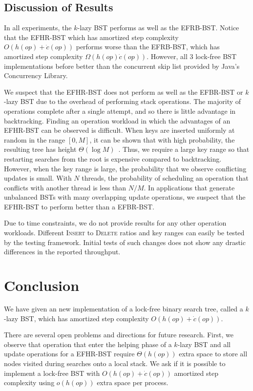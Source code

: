 \documentclass[letterpaper,twocolumn]{article}
\begin{document}
\subsection{Discussion of Results}
In all experiments, the $k$-lazy BST performs as well as the EFRB-BST. Notice that the EFHR-BST which has amortized step complexity $O(h(op) + \dot{c}(op))$ performs worse than the EFRB-BST, which has amortized step complexity $\Omega(h(op)\dot{c}(op))$. However, all 3 lock-free BST implementations before better than the concurrent skip list provided by Java's Concurrency Library. 

We suspect that the EFHR-BST does not perform as well as the EFBR-BST or $k$-lazy BST due to the overhead of performing stack operations. The majority of operations complete after a single attempt, and so there is little advantage in backtracking. Finding an operation workload in which the advantages of an EFHR-BST can be observed is difficult. When keys are inserted uniformly at random in the range $[0,M]$, it can be shown that with high probability, the resulting tree has height $\Theta(\log M)$~\cite{CLRS}. Thus, we require a large key range so that restarting searches from the root is expensive compared to backtracking. However, when the key range is large, the probability that we observe conflicting updates is small. With $N$ threads, the probability of scheduling an operation  that conflicts with another thread is less than $N/M$. In applications that generate unbalanced BSTs with many overlapping update operations, we suspect that the EFHR-BST to perform better than a EFBR-BST. 

Due to time constraints, we do not provide results for any other operation workloads. Different \textsc{Insert} to \textsc{Delete} ratios and key ranges can easily be tested by the testing framework. Initial tests of such changes does not show any drastic differences in the reported throughput.

\section{Conclusion}\label{section_conclusion}
We have given an new implementation of a lock-free binary search tree, called a $k$-lazy BST, which has amortized step complexity $O(h(op) + \dot{c}(op))$. 

There are several open problems and directions for future research. First, we observe that operation that enter the helping phase of a $k$-lazy BST and all update operations for a EFHR-BST require $\Theta(h(op))$ extra space to store all nodes visited during searches onto a local stack. We ask if it is possible to implement a lock-free BST with $O(h(op) + \dot{c}(op))$ amortized step complexity using $o(h(op))$ extra space per process.
\end{document}
